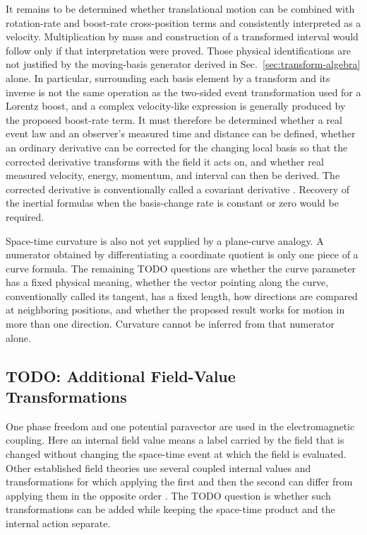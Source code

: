 It remains to be determined whether translational motion can be combined
with rotation-rate and boost-rate cross-position terms and consistently
interpreted as a velocity. Multiplication by mass and construction of a
transformed interval would follow only if that interpretation were proved.
Those physical identifications are not justified by the moving-basis generator derived in
Sec.\ \ref{sec:transform-algebra} alone. In particular, surrounding each
basis element by a transform and its inverse is not the same operation as the
two-sided event transformation used for a Lorentz boost, and a complex
velocity-like expression is generally produced by the proposed boost-rate
term. It must therefore be determined whether a real event law and an
observer's measured time and distance can be defined, whether an ordinary
derivative can be corrected for the changing local basis so that the
corrected derivative transforms with the field it acts on, and whether real
measured velocity, energy, momentum, and interval can then be derived. The
corrected derivative is conventionally called a covariant derivative
\cite{doran2003}. Recovery of the inertial formulas when the
basis-change rate is constant or zero would be required.

Space-time curvature is also not yet supplied by a plane-curve analogy.
A numerator obtained by differentiating a coordinate quotient is only one
piece of a curve formula. The remaining TODO questions are whether the curve
parameter has a fixed physical meaning, whether the vector pointing along
the curve, conventionally called its tangent, has a fixed length, how
directions are compared at neighboring positions, and whether the proposed
result works for motion in more than one direction. Curvature
cannot be inferred from that numerator alone.

\subsection{TODO: Additional Field-Value Transformations}
One phase freedom and one potential paravector are used in the electromagnetic
coupling. Here an internal field value means a label carried by the field
that is changed without changing the space-time event at which the field is
evaluated. Other established field theories use several coupled internal
values and transformations for which applying the first and then the second
can differ from applying them in the opposite order \cite{doran2003}. The
TODO question is whether such transformations can be added while keeping the
space-time product and the internal action separate.

